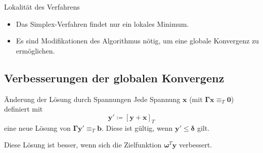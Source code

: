 \documentclass[accentcolor = tud11b, colorbacktitle, landscape, german, presentation, tudmathserif]{tudbeamer}
\newcommand{\mat}[1]{\boldsymbol{\mathbf{#1}}}
\renewcommand{\vec}[1]{\boldsymbol{\mathbf{#1}}}
\begin{document}
%						
		
			\begin{frame}{Lokalität des Verfahrens}
				\begin{itemize}
					\item Das Simplex-Verfahren findet nur ein lokales Minimum.
					\item Es sind Modifikationen des Algorithmus nötig, um eine globale Konvergenz zu ermöglichen.
				\end{itemize}
			\end{frame}
		
		\subsection{Verbesserungen der globalen Konvergenz}
			\begin{frame}{Änderung der Lösung durch Spannungen}
				Jede Spannung \( \vec{x} \) (mit \( \mat{\Gamma} \vec{x} \equiv_T \vec{0} \)) definiert mit
				\begin{equation*}
					\vec{y}' \coloneqq [\vec{y} + \vec{x}]_T
				\end{equation*}
				eine neue Lösung von \( \mat{\Gamma} \vec{y}' \equiv_T \vec{b} \). Diese ist gültig, wenn \( \vec{y}' \leq \vec{\delta} \) gilt.
				
				\vspace{0.5cm}
				Diese Lösung ist besser, wenn sich die Zielfunktion \( \vec{\omega}^T \vec{y} \) verbessert.
			\end{frame}
		
\end{document}

